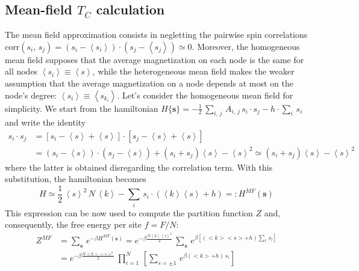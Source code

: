 \subsection*{Mean-field $T_C$ calculation} \label{app:mean_field}
{\small
The mean field approximation consists in negletting the pairwise spin correlations $
    \text{corr}(s_i,\,s_j) = (s_i - \left\langle s_i \right \rangle)\cdot (s_j - \left\langle s_j \right \rangle)\simeq 0 $.
Moreover, the homogeneous mean field supposes that the average magnetization on each node is the same for all nodes $\left\langle s_i\right\rangle \equiv \left \langle s \right \rangle$, while the heterogeneous mean field makes the weaker assumption that the average magnetization on a node depends at most on the node's degree: $\left \langle s_i\right \rangle \equiv \left\langle s_{k_i}\right\rangle$. 
Let's consider the homogeneous mean field for simplicity. \medskip \newline \noindent
We start from the hamiltonian $H\{\mathbf{s}\} = -\frac{1}{2}\, \sum_{i,\,j}\,A_{i,\,j}\,s_i\cdot s_j - h\cdot\sum_{i}\,s_i$ and write the identity 
\begin{align*}
    s_i\cdot s_j &= [s_i - \left\langle s \right \rangle + \left\langle s \right \rangle]\cdot [s_j - \left\langle s \right \rangle + \left\langle s \right \rangle] \\
    &= (s_i - \left\langle s \right \rangle)\cdot (s_j-\left\langle s \right \rangle) + (s_i + s_j) \left\langle s \right \rangle - \left\langle s \right \rangle^2 \simeq (s_i + s_j) \left\langle s \right \rangle - \left\langle s \right \rangle^2
\end{align*} where the latter is obtained disregarding the correlation term. With this substitution, the hamiltonian becomes 
\begin{equation*}
    H \simeq\frac{1}{2}\,\left\langle s \right \rangle^2\,N\,\left\langle k \right \rangle - \sum_i\,s_i\cdot (\left\langle k \right \rangle\left\langle s \right \rangle + h)=: H^{MF}(\mathbf{s})
\end{equation*}
This expression can be now used to compute the partition function $Z$ and, consequently, the free energy per site $f= F/N$:
\begin{align*}
    Z^{MF} &= \sum_{\mathbf{s}}\, e^{-\beta H^{MF}(\mathbf{s})} = e^{-\beta \frac{N \left\langle k \right \rangle\left\langle s \right \rangle^2}{2}}\, \sum_{\mathbf{s}}\, e^{\beta\left[(<k><s> + h)\sum_l\,s_l\right]} \\
    &= e^{-\beta \frac{N <k><s>^2}{2}}\, \prod_{i=1}^{N}\, \left[ \sum_{s = \pm 1}\, e^{\beta(<k>+h)\,s_i} \right] \\

\end{align*}}
